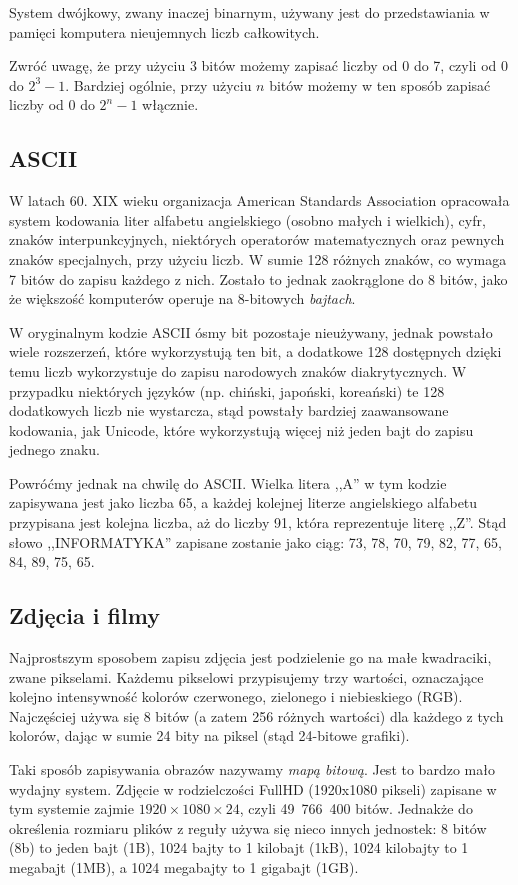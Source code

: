 \documentclass[11pt]{book}
\begin{document}
System dwójkowy, zwany inaczej binarnym, używany jest do przedstawiania w
pamięci komputera nieujemnych liczb całkowitych.

Zwróć uwagę, że przy użyciu 3 bitów możemy zapisać liczby od 0 do 7, czyli
od 0 do $2^3-1$. Bardziej ogólnie, przy użyciu $n$ bitów możemy w ten sposób
zapisać liczby od 0 do $2^n-1$ włącznie.

\subsection{ASCII}
W latach 60. XIX wieku organizacja American Standards Association opracowała
system kodowania liter alfabetu angielskiego (osobno małych i wielkich), cyfr, 
znaków interpunkcyjnych, niektórych operatorów matematycznych oraz pewnych 
znaków specjalnych, przy użyciu liczb. W sumie 128 różnych znaków, co wymaga
7 bitów do zapisu każdego z nich. Zostało to jednak zaokrąglone do 8 bitów,
jako że większość komputerów operuje na 8-bitowych \textit{bajtach}.

W oryginalnym kodzie ASCII ósmy bit pozostaje nieużywany, jednak powstało
wiele rozszerzeń, które wykorzystują ten bit, a dodatkowe 128 dostępnych dzięki
temu liczb wykorzystuje do zapisu narodowych znaków diakrytycznych. W przypadku
niektórych języków (np. chiński, japoński, koreański) te 128 dodatkowych liczb
nie wystarcza, stąd powstały bardziej zaawansowane kodowania, jak Unicode,
które wykorzystują więcej niż jeden bajt do zapisu jednego znaku.

Powróćmy jednak na chwilę do ASCII. Wielka litera ,,A'' w tym kodzie zapisywana
jest jako liczba 65, a każdej kolejnej literze angielskiego alfabetu
przypisana jest kolejna liczba, aż do liczby 91, która reprezentuje literę
,,Z''. Stąd słowo ,,INFORMATYKA'' zapisane zostanie jako ciąg: 73, 78, 70, 79,
82, 77, 65, 84, 89, 75, 65. 

\subsection{Zdjęcia i filmy}
Najprostszym sposobem zapisu zdjęcia jest podzielenie go na małe kwadraciki,
zwane pikselami. Każdemu pikselowi przypisujemy trzy wartości, oznaczające
kolejno intensywność kolorów czerwonego, zielonego i niebieskiego (RGB). 
Najczęściej używa się 8 bitów (a zatem 256 różnych wartości) dla każdego 
z tych kolorów, dając w sumie 24 bity na piksel (stąd 24-bitowe grafiki).

Taki sposób zapisywania obrazów nazywamy \textit{mapą bitową}. Jest to bardzo
mało wydajny system. Zdjęcie w rodzielczości FullHD (1920x1080 pikseli)
zapisane w tym systemie zajmie $1920 \times 1080 \times 24$, czyli 49~766~400
bitów. Jednakże do określenia rozmiaru plików z reguły używa się nieco innych
jednostek: 8 bitów (8b) to jeden bajt (1B), 1024 bajty to 1 kilobajt (1kB),
1024 kilobajty to 1 megabajt (1MB), a 1024 megabajty to 1 gigabajt (1GB).
\end{document}
